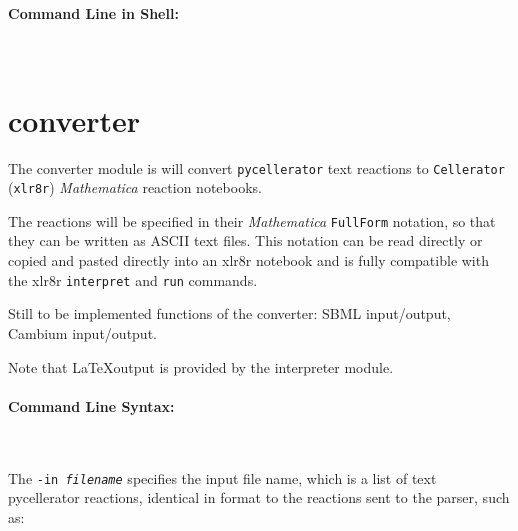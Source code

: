 \paragraph{Command Line in Shell:}\ \\


\newpage
\section{converter}

The converter module is will convert {\tt pycellerator} text reactions to {\tt Cellerator} ({\tt xlr8r}) \textit{Mathematica} reaction notebooks. 

The reactions will be specified in their \textit{Mathematica} {\tt FullForm} notation, so that they can be written as ASCII text files. This notation can be read directly or copied and pasted directly into an xlr8r notebook and is fully compatible with the xlr8r {\tt interpret} and {\tt run} commands.

Still to be implemented functions of the converter: SBML input/output, Cambium input/output.

Note that \LaTeX output is provided by the interpreter module.  

\paragraph{Command Line Syntax:}\ \\


The {\tt -in \textit{filename}} specifies the input file name, which is a list of text pycellerator reactions, identical in format to the reactions sent to the parser, such as: 

